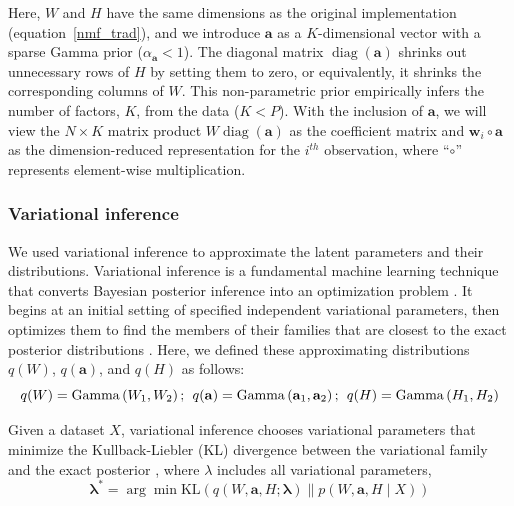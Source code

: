 Here, $W$ and $H$ have the same dimensions as the original implementation (equation~\ref{nmf_trad}), and we introduce $\mathbf{a}$ as a $K$-dimensional vector with a sparse Gamma prior ($\alpha_\mathbf{a} < 1$). The diagonal matrix $\operatorname{diag}(\mathbf{a})$ shrinks out unnecessary rows of $H$ by setting them to zero, or equivalently, it shrinks the corresponding columns of $W$. This non-parametric prior empirically infers the number of factors, $K$, from the data ($K < P$). With the inclusion of $\mathbf{a}$, we will view the $N \times K$ matrix product $W\operatorname{diag}(\mathbf{a})$ as the coefficient matrix and $\mathbf{w}_{i} \circ \mathbf{a}$ as the dimension-reduced representation for the $i^{th}$ observation, where ``$\circ$'' represents element-wise multiplication.

\subsubsection{Variational inference}
\label{methods_vi}
We used variational inference to approximate the latent parameters and their distributions. Variational inference is a fundamental machine learning technique that converts Bayesian posterior inference into an optimization problem \citep{jordan2004graphical,ormerod2010explaining}. It begins at an initial setting of specified independent variational parameters, then optimizes them to find the members of their families that are closest to the exact posterior distributions \citep{wainwright2008graphical}. Here, we defined these approximating distributions $q(W)$, $q(\mathbf{a})$, and $q(H)$ as follows:
\begin{equation}
q(W) =\operatorname{Gamma}\left(W_{1}, W_{2}\right); \hspace{1ex} q(\mathbf{a})=\operatorname{Gamma}\left(\mathbf{a}_{1}, \mathbf{a}_{2}\right); \hspace{1ex}
q(H) =\operatorname{Gamma}\left(H_{1}, H_{2}\right)
\end{equation}

Given a dataset $X$, variational inference chooses variational parameters that minimize the Kullback-Liebler (KL) divergence between the variational family and the exact posterior \citep{jordan1999introduction}, where $\lambda$ includes all variational parameters, 
\begin{equation}
    \boldsymbol{\lambda}^{*}=\arg \min \mathrm{KL}(q(W, \mathbf{a}, H ; \boldsymbol{\lambda}) \| p(W, \mathbf{a}, H \mid X))
\end{equation}

